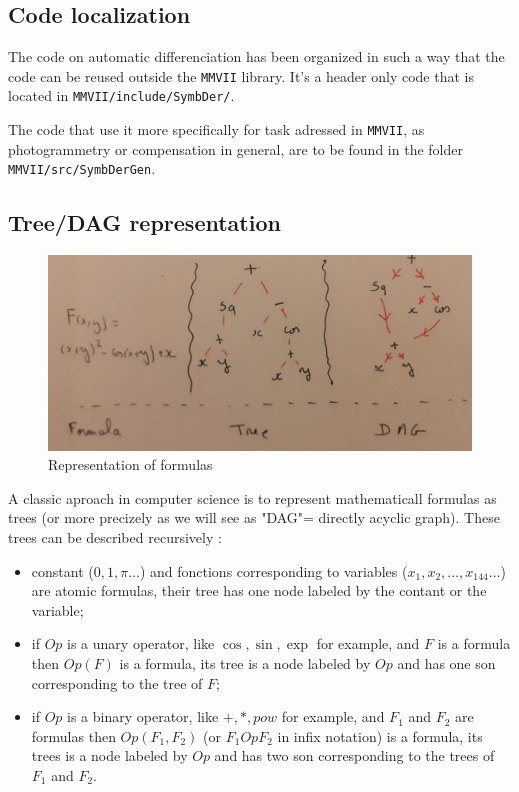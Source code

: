 \subsection{Code localization}

The code on automatic differenciation has been organized in such a way that 
the code can be reused outside the {\tt MMVII} library. It's a header only code
that is located in {\tt MMVII/include/SymbDer/}.


The code that use it more specifically for task adressed in  {\tt MMVII},
as photogrammetry or compensation in general, are to be found in the
folder  {\tt MMVII/src/SymbDerGen}.


\subsection{Tree/DAG representation}

\begin{figure}
\centering
\includegraphics[width=12cm]{Programmer/ImagesProg/Tree.jpg}
\caption{Representation of formulas}
\label{fig:TreeFormula}
\end{figure}

A classic aproach in computer science is to represent mathematicall formulas 
as trees (or more precizely as we will see as "DAG"=  directly acyclic graph).
These trees can be described recursively :

\begin{itemize}
   \item  constant ($0,1,\pi \dots$)  and fonctions corresponding to variables ($x_1,x_2,\dots ,x_{144} \dots$)
          are  atomic formulas, their tree has one node labeled by the contant or the variable;

   \item if $Op$ is a unary operator, like $\cos, \sin, \exp $ for example,  and $F$ is a formula then $Op(F)$ is a 
         formula, its tree is a node labeled by $Op$ and has one son corresponding to the tree of $F$;

   \item if $Op$ is a binary operator, like $+,*,pow $ for example,  and $F_1$  and $F_2$ are 
	   formulas then $Op(F_1,F_2)$ (or $F_1 Op F_2$ in infix notation) is a 
         formula,  its trees is a node labeled by $Op$ and has two son corresponding to the trees of $F_1$ and $F_2$.
\end{itemize}


